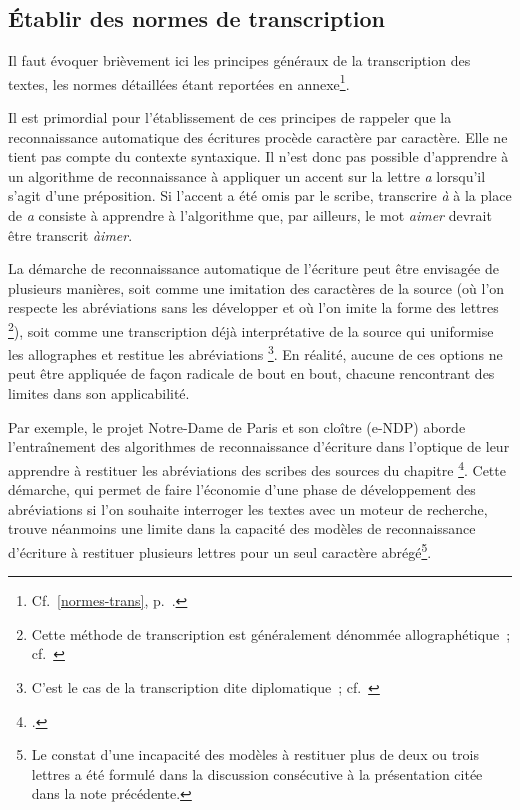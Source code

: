 \documentclass[a4paper,12pt,twoside]{book}
\begin{document}
			\subsection{Établir des normes de transcription}
				Il faut évoquer brièvement ici les principes généraux de la transcription des textes, les normes détaillées étant reportées en annexe\footnote{Cf.~\ref{normes-trans}, p.~\pageref{normes-trans}.}.
				
				Il est primordial pour l'établissement de ces principes de rappeler que la reconnaissance automatique des écritures procède caractère par caractère. Elle ne tient pas compte du contexte syntaxique. Il n'est donc pas possible d'apprendre à un algorithme de reconnaissance à appliquer un accent sur la lettre \textit{a} lorsqu'il s'agit d'une préposition. Si l'accent a été omis par le scribe, transcrire \textit{à} à la place de \textit{a} consiste à apprendre à l'algorithme que, par ailleurs, le mot \textit{aimer} devrait être transcrit \textit{àimer}.
				
				La démarche de reconnaissance automatique de l'écriture peut être envisagée de plusieurs manières, soit comme une imitation des caractères de la source (où l'on respecte les abréviations sans les développer et où l'on imite la forme des lettres%
				\footnote{Cette méthode de transcription est généralement dénommée allographétique~; cf.~\cite[p.~250 \textit{et passim}]{stutzmannPaleographieStatistiquePour2011}}), %
				soit comme une transcription déjà interprétative de la source qui uniformise les allographes et restitue les abréviations%
				\footnote{C'est le cas de la transcription dite diplomatique~; cf.~\cite{guyotjeanninDiplomatiqueMedievale2006}}.
				En réalité, aucune de ces options ne peut être appliquée de façon radicale de bout en bout, chacune rencontrant des limites dans son applicabilité.
				
				Par exemple, le projet Notre-Dame de Paris et son cloître (e-NDP) aborde l'entraînement des algorithmes de reconnaissance d'écriture dans l'optique de leur apprendre à restituer les abréviations des scribes des sources du chapitre
				\footcite{torresaguilarENDPNotreDameParis2022}.
				Cette démarche, qui permet de faire l'économie d'une phase de développement des abréviations si l'on souhaite interroger les textes avec un moteur de recherche, trouve néanmoins une limite dans la capacité des modèles de reconnaissance d'écriture à restituer plusieurs lettres pour un seul caractère abrégé\footnote{Le constat d'une incapacité des modèles à restituer plus de deux ou trois lettres a été formulé dans la discussion consécutive à la présentation citée dans la note précédente.}.
				
\end{document}

